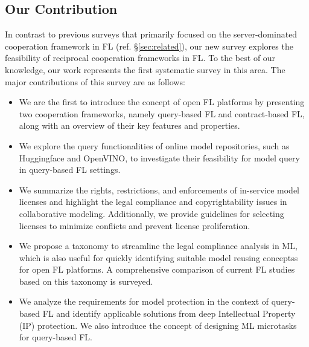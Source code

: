 \subsection{Our Contribution}
\label{sec:contribution}
  In contrast to previous surveys that primarily focused on the server-dominated cooperation framework in FL (ref. \S\ref{sec:related}),  our new survey explores the feasibility of reciprocal cooperation frameworks in FL.
  To the best of our knowledge, our work represents the first systematic survey in this area.
  The major contributions of this survey are as follows:
  \begin{itemize}
      \item We are the first to introduce the concept of open FL platforms by presenting two cooperation frameworks, namely query-based FL and contract-based FL, along with an overview of their key features and properties.
      \item We explore the query functionalities of online model repositories, such as Huggingface and OpenVINO, to investigate their feasibility for model query in query-based FL settings.
      \item We summarize the rights, restrictions, and enforcements of in-service model licenses and highlight the legal compliance and copyrightability issues in collaborative modeling. Additionally, we provide guidelines for selecting licenses to minimize conflicts and prevent license proliferation.
      \item We propose a taxonomy to streamline the legal compliance analysis in ML, which is also useful for quickly identifying suitable model reusing conceptss for open FL platforms. A comprehensive comparison of current FL studies based on this taxonomy is surveyed.
      \item We analyze the requirements for model protection in the context of query-based FL and identify applicable solutions from deep Intellectual Property (IP) protection. We also introduce the concept of designing ML microtasks for query-based FL.
\end{itemize}


